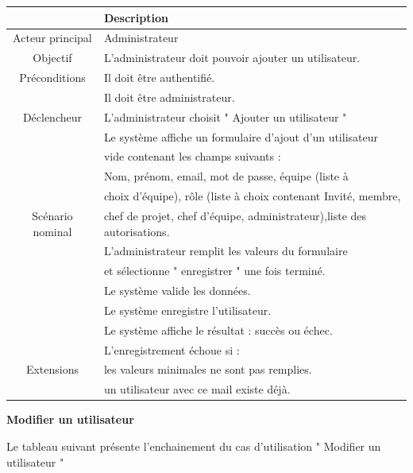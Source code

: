 \begin{center}
\begin{tabular}{|c|l|}
\hline 
&\textbf { Description }\\\hline 
    Acteur principal & Administrateur \\\hline 
    Objectif&L’administrateur doit pouvoir ajouter un utilisateur.\\\hline
    Préconditions&Il doit être authentifié.  \\&Il doit être administrateur.\\\hline 
    Déclencheur&L’administrateur choisit " Ajouter un utilisateur "\\\hline 
    &Le système affiche un formulaire d’ajout d’un utilisateur  \\& vide contenant les champs suivants : \\
    &Nom, prénom, email, mot de passe, équipe (liste à \\
    &choix d’équipe), rôle (liste à choix contenant Invité, membre,\\Scénario nominal&chef de projet, chef d’équipe, administrateur),liste des autorisations.\\
    &L’administrateur remplit les valeurs du formulaire \\
    & et sélectionne " enregistrer " une fois terminé.\\
    &Le système valide les données. \\
    &Le système enregistre l’utilisateur.  \\
    &Le système affiche le résultat : succès ou échec. \\\hline
    &L’enregistrement échoue si :  \\
    Extensions&les valeurs minimales ne sont pas remplies.  \\
    &un utilisateur avec ce mail existe déjà.\\\hline
\end{tabular}
\label{desc_ajout_ut}
\end{center}\newpage
\par \textbf{ 	Modifier un utilisateur}
\par Le tableau suivant présente l’enchainement du cas d’utilisation " Modifier un utilisateur "
